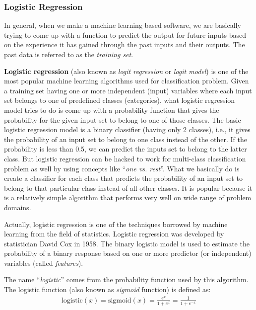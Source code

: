 \subsubsection{ Logistic Regression}
In general, when we make a machine learning based software, we are basically
trying to come up with a function to predict the output for future inputs based
on the experience it has gained through the past inputs and their outputs.
The past data is referred to as the {\em training set}.

{\bf Logistic regression}\cite{ng} (also known as {\em logit regression} or {\em logit model}) is one of
the most popular machine learning algorithms used for classification problem.
Given a training set having one or more independent (input) variables where
each input set belongs to one of predefined classes (categories), what
logistic regression model tries to do is come up with a probability function
that gives the probability for the given input set to belong to one of those
classes. The basic logistic regression model is a binary classifier (having
only 2 classes), i.e., it gives the probability of an input set to belong to
one class instead of the other. If the probability is less than 0.5, we can
predict the inputs set to belong to the latter class. But logistic regression
can be hacked to work for multi-class classification problem as well by using
concepts like ``{\em one vs. rest}''. What we basically do is create a classifier for
each class that predicts the probability of an input set to belong to that
particular class instead of all other classes. It is popular because it is a
relatively simple algorithm that performs very well on wide range of problem
domains.

Actually, logistic regression is one of the techniques borrowed by machine
learning from the field of statistics. Logistic regression was developed by
statistician David Cox in 1958. The binary logistic model is used to estimate
the probability of a binary response based on one or more predictor
(or independent) variables (called {\em features}).

The name ``{\em logistic}'' comes from the probability function used by this algorithm.
The logistic function (also known as {\em sigmoid} function) is defined as:
\begin{align}
  \text{logistic}(x) = \text{sigmoid}(x)
  = \frac{e^x}{1 + e^x}
  = \frac{1}{1 + e^{-x}} \label{eqn:logit}
\end{align}

